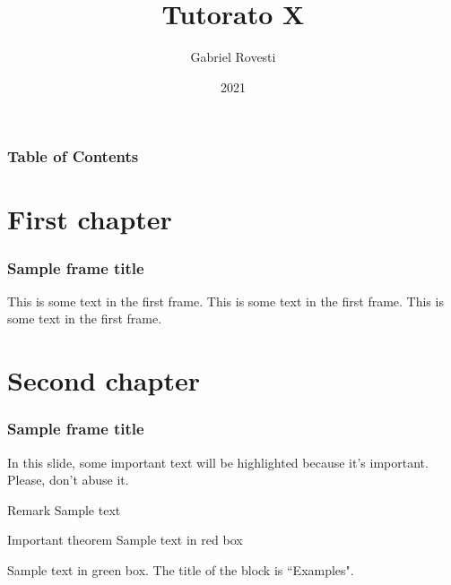 \documentclass{beamer}
\title{Tutorato X}
\author{Gabriel Rovesti}
\institute{Università degli Studi di Padova}
\date{2021}
\begin{document}
\frame{\titlepage}

\begin{frame}
\frametitle{Table of Contents}
\tableofcontents
\end{frame}

\section{First chapter}
\begin{frame}
\frametitle{Sample frame title}
This is some text in the first frame. This is some text in the first frame. This is some text in the first frame.
\end{frame}

\section{Second chapter}
\begin{frame}
\frametitle{Sample frame title}

In this slide, some important text will be
\alert{highlighted} because it's important.
Please, don't abuse it.

\begin{block}{Remark}
Sample text
\end{block}

\begin{alertblock}{Important theorem}
Sample text in red box
\end{alertblock}

\begin{examples}
Sample text in green box. The title of the block is ``Examples".
\end{examples}
\end{frame}
\end{document}
